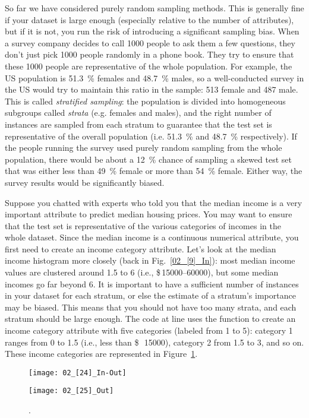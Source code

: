 So far we have considered purely random sampling methods. This is generally fine if your dataset is large enough (especially relative to the number of attributes), but if it is not, you run the risk of introducing a significant sampling bias. When a survey company decides to call \num{1000} people to ask them a few questions, they don't just pick \num{1000} people randomly in a phone book. They try to ensure that these \num{1000} people are representative of the whole population. For example, the US population is \SI{51.3}{\percent} females and \SI{48.7}{\percent} males, so a well-conducted survey in the US would try to maintain this ratio in the sample: 513 female and 487 male. This is called \emph{stratified sampling}: the population is divided into homogeneous subgroups called \emph{strata} (e.g. females and males), and the right number of instances are sampled from each stratum to guarantee that the test set is representative of the overall population (i.e. \SI{51.3}{\percent} and \SI{48.7}{\percent} respectively). If the people running the survey used purely random sampling from the whole population, there would be about a \SI{12}{\percent} chance of sampling a skewed test set that was either less than \SI{49}{\percent} female or more than \SI{54}{\percent} female. Either way, the survey results would be significantly biased.

Suppose you chatted with experts who told you that the median income is a very important attribute to predict median housing prices. You may want to ensure that the test set is representative of the various categories of incomes in the whole dataset. Since the median income is a continuous numerical attribute, you first need to create an income category attribute. Let's look at the median income histogram more closely (back in  Fig.~\ref{02_[9]_In}): most median income values are clustered around 1.5 to 6 (i.e., \$\,\numrange{15000}{60000}), but some median incomes go far beyond 6. It is important to have a sufficient number of instances in your dataset for each stratum, or else the estimate of a stratum's importance may be biased. This means that you should not have too many strata, and each stratum should be large enough. The code at line  uses the  function to create an income category attribute with five categories (labeled from 1 to 5): category 1 ranges from 0 to 1.5 (i.e., less than \SI{15000}[\$\,]{}), category 2 from 1.5 to 3, and so on. These income categories are represented in Figure~\ref{02_[24-25]_In-Out}.
\begin{figure}[h!t]
\centering
\texttt{[image: 02\_[24]\_In-Out]}

\vspace{\baselineskip}\noindent
\texttt{[image: 02\_[25]\_Out]}
\caption{.}\label{02_[24-25]_In-Out}
\end{figure}

